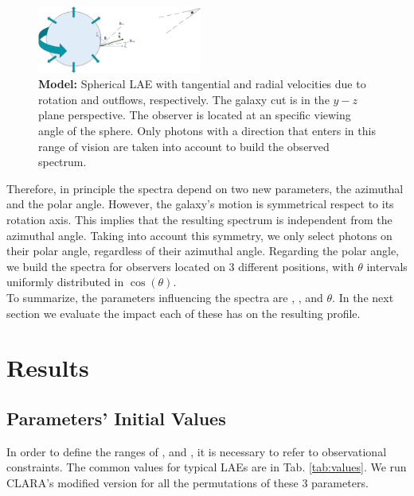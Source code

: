 \documentclass[twocolappendix]{latex/emulateapj}
\begin{document}
\begin{figure}[h!]
	\begin{center}
		\includegraphics[width=0.48\textwidth]{./figures/model}
	\end{center}
	\caption{\textbf{Model:} Spherical LAE with tangential and radial velocities due to rotation and outflows, respectively. The galaxy cut is in the $y-z$ plane perspective. The observer is located at an specific viewing angle of the sphere. Only photons with a direction that enters in this range of vision are taken into account to build the observed spectrum.
		\label{fig:model}}
\end{figure}

Therefore, in principle the spectra depend on two new parameters, the azimuthal and the polar angle. However, the galaxy's motion is symmetrical respect to its rotation axis. This implies that the resulting spectrum is independent from the azimuthal angle. Taking into account this symmetry, we only select photons on their polar angle, regardless of their azimuthal angle. Regarding the polar angle, we build the spectra for observers located on 3 different positions, with $\theta$ intervals uniformly distributed in $\cos(\theta)$. \\ 

To summarize, the parameters influencing the spectra are \vrot, \vout, \tauh and $\theta$. In the next section we evaluate the impact each of these has on the resulting profile. \\


\section{Results}
\label{sec:results}

\subsection{Parameters' Initial Values}
In order to define the ranges of \tauh, \vrot and \vout, it is necessary to refer to observational constraints. The common values for typical LAEs are in Tab. \ref{tab:values}. We run CLARA's modified version for all the permutations of these 3 parameters. \\
\end{document}
